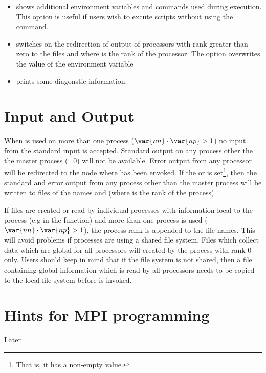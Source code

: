 \begin{itemize}
 \item[\programopt{-e}] shows additional environment variables and commands used during  execution. This option is useful if users wish to excute scripts without using the  command.

 \item[\programopt{-o}] switches on the redirection of output of processors with \MPI rank greater than zero to the files  and  where  is the rank of the processor. The option overwrites the value of the  environment variable 


 \item[\programopt{-v}] prints some diagonstic information.
\end{itemize}

\section{Input and Output}
When \MPI is used on more than one process ($\var{nn} \cdot \var{np} >1$) no input from the standard input is accepted. Standard output on any process other the the master process (=0) will not be available.
Error output from any processor will be redirected to the node where  has been envoked.
If the  or  is set\footnote{That is, it has a non-empty value.}, then the standard and error output from any process other than the master process will be written to files of the names  and  (where 
 is the rank of the process).

If files are created or read by individual \MPI processes with information local to the process (e.g in the  function)  and more than one process is used ($\var{nn} \cdot \var{np} >1$), the \MPI process rank is appended to the file names.
This will avoid problems if processes are using a shared file system.
Files which collect data which are global for all \MPI processors will created by the process with \MPI rank 0 only.
Users should keep in mind that if the file system is not shared, then a file containing global information
which is read by all processors needs to be copied to the local file system before  is invoked.
 

\section{Hints for MPI programming}
Later